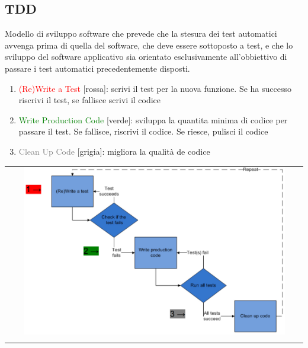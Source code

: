 \subsection{TDD}
Modello di sviluppo software che prevede che la stesura dei test automatici avvenga prima di quella del software, che deve essere sottoposto a test, e che lo sviluppo del software applicativo sia orientato esclusivamente all'obbiettivo di passare i test automatici precedentemente disposti.
\begin{enumerate}
    \item \textcolor{red}{(Re)Write a Test} [rossa]: scrivi il test per la nuova funzione. Se ha successo riscrivi il test, se fallisce scrivi il codice
    \item \textcolor{green}{Write Production Code} [verde]: sviluppa la quantita minima di codice per passare il test. Se fallisce, riscrivi il codice. Se riesce, pulisci il codice
    \item \textcolor{gray}{Clean Up Code} [grigia]: migliora la qualità de codice
\end{enumerate}
\begin{center}
    \begin{tabular}{c}
        \\ \includegraphics[width=0.9\textwidth]{images/UnitTesting1.png} \\ \\
    \end{tabular}
\end{center}

\newpage
